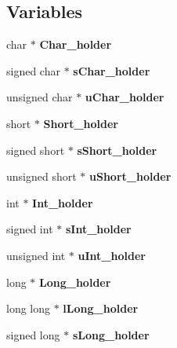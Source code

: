 \subsection*{Variables}
\begin{DoxyCompactItemize}
\item 
char $\ast$ {\bfseries Char\+\_\+holder}\label{group__prep__group_ga6c28268b220bf8963e9d83ab3ea4e1fc}

\item 
signed char $\ast$ {\bfseries s\+Char\+\_\+holder}\label{group__prep__group_ga2952cc9f34c30813a61bbf448687cb37}

\item 
unsigned char $\ast$ {\bfseries u\+Char\+\_\+holder}\label{group__prep__group_ga515997135a9fd60f330e7c80ba35e4a3}

\item 
short $\ast$ {\bfseries Short\+\_\+holder}\label{group__prep__group_ga50dfd89c93ee41c7a4d361449ff54b66}

\item 
signed short $\ast$ {\bfseries s\+Short\+\_\+holder}\label{group__prep__group_gae5801f872635cae195d49f253976bafb}

\item 
unsigned short $\ast$ {\bfseries u\+Short\+\_\+holder}\label{group__prep__group_ga44eb5e51833f5adb71a5566f4c044947}

\item 
int $\ast$ {\bfseries Int\+\_\+holder}\label{group__prep__group_gae717b1cf30ad00b04f5e492ade36bacc}

\item 
signed int $\ast$ {\bfseries s\+Int\+\_\+holder}\label{group__prep__group_ga7fdea5b2401ae8217aa51cfef7965452}

\item 
unsigned int $\ast$ {\bfseries u\+Int\+\_\+holder}\label{group__prep__group_ga5d873117ab0bcac78e1c027843f5c813}

\item 
long $\ast$ {\bfseries Long\+\_\+holder}\label{group__prep__group_ga5684531bd7fc7624b968eb17b2fe961a}

\item 
long long $\ast$ {\bfseries l\+Long\+\_\+holder}\label{group__prep__group_ga71901a53a2dd9764340602973b0a9102}

\item 
signed long $\ast$ {\bfseries s\+Long\+\_\+holder}\label{group__prep__group_ga14f3d44ac57e9e7d5f06d1fba4fc32b6}


\end{DoxyCompactItemize}
